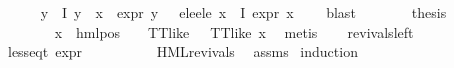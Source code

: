 \begin{isabellebody}
\ \ \ \ \ \ \isamarkupfalse%
\ {\isacartoucheopen}{\isacharparenleft}{\kern0pt}{\isasymforall}y{\isasymin}{\isasymPhi}\ {\isacharbackquote}{\kern0pt}\ I{\isachardot}{\kern0pt}\ y\ {\isasymnoteq}\ x\ {\isasymlongrightarrow}\ expr{\isacharunderscore}{\kern0pt}{}\ y\ {\isasymle}\ {}{\isacharparenright}{\kern0pt}{\isacartoucheclose}\ e{}{\isacharunderscore}{\kern0pt}le{\isacharunderscore}{\kern0pt}{}{\isacharunderscore}{\kern0pt}e{}{\isacharunderscore}{\kern0pt}le{\isacharunderscore}{\kern0pt}{}\ {\isacartoucheopen}{\isasymforall}x{\isasymin}{\isasymPhi}\ {\isacharbackquote}{\kern0pt}\ I{\isachardot}{\kern0pt}\ expr{\isacharunderscore}{\kern0pt}{}\ x\ {\isasymle}\ {}{\isacartoucheclose}\ \isamarkupfalse%
\ blast\isanewline
\ \ \ \ \isamarkupfalse%
\ \isamarkupfalse%
\ {\isacharquery}{\kern0pt}thesis\isanewline
\ \ \ \ \ \ \isamarkupfalse%
\ {\isacartoucheopen}{\isacharparenleft}{\kern0pt}{\isasymexists}{\isasymalpha}\ {\isasymchi}{\isachardot}{\kern0pt}\ x\ {\isacharequal}{\kern0pt}\ hml{\isacharunderscore}{\kern0pt}pos\ {\isasymalpha}\ {\isasymchi}\ {\isasymand}\ TT{\isacharunderscore}{\kern0pt}like\ {\isasymchi}{\isacharparenright}{\kern0pt}\ {\isasymor}\ TT{\isacharunderscore}{\kern0pt}like\ x{\isacartoucheclose}\ \isamarkupfalse%
\ metis\isanewline
\ \ \isamarkupfalse%
\isanewline
{}\isamarkupfalse%
%
\endisatagproof
{\isafoldproof}%
%
\isadelimproof
\isanewline
%
\endisadelimproof
\isanewline
{}\isamarkupfalse%
\ revivals{\isacharunderscore}{\kern0pt}left{\isacharcolon}{\kern0pt}\isanewline
\ \ \ {\isachardoublequoteopen}less{\isacharunderscore}{\kern0pt}eq{\isacharunderscore}{\kern0pt}t\ {\isacharparenleft}{\kern0pt}expr\ {\isasymphi}{\isacharparenright}{\kern0pt}\ {\isacharparenleft}{\kern0pt}{\isasyminfinity}{\isacharcomma}{\kern0pt}\ {}{\isacharcomma}{\kern0pt}\ {}{\isacharcomma}{\kern0pt}\ {}{\isacharcomma}{\kern0pt}\ {}{\isacharcomma}{\kern0pt}\ {}{\isacharparenright}{\kern0pt}{\isachardoublequoteclose}\isanewline
\ \ \ {\isachardoublequoteopen}HML{\isacharunderscore}{\kern0pt}revivals\ {\isasymphi}{\isachardoublequoteclose}\isanewline
%
\isadelimproof
%
\endisadelimproof
%
\isatagproof
{}\isamarkupfalse%
\ assms\ \isamarkupfalse%
{\isacharparenleft}{\kern0pt}induction\ {\isasymphi}{\isacharparenright}{\kern0pt}\isanewline

\end{isabellebody}
